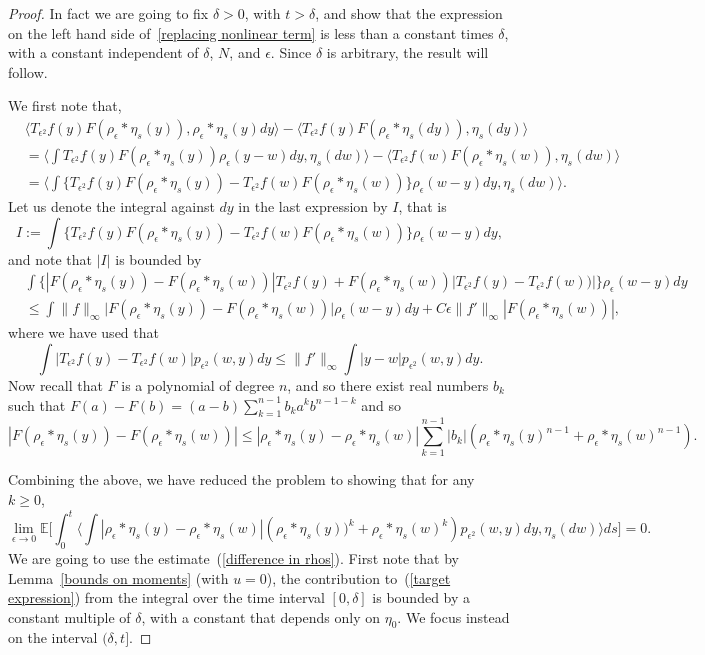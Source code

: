 \documentclass[EJP]{ejpecp} %
\newcommand{\IE}{\mathbb E}
\begin{document}
\begin{proof}
In fact we are going to fix $\delta>0$, with $t>\delta$, and show that
the expression on the left hand side of~\eqref{replacing nonlinear term} is
less than a constant times $\delta$, with a constant independent of $\delta$,
$N$, and $\epsilon$. Since $\delta$ is arbitrary, the result will follow.

We first note that,
\begin{align*}
    &
\langle T_{\epsilon^2} f(y) F(\rho_\epsilon * \eta_s(y)), 
\rho_\epsilon * \eta_s(y) dy \rangle 
-\langle T_{\epsilon^2} f(y) F(\rho_\epsilon *\eta_s(dy)), \eta_s(dy) \rangle 
\\ 
& = 
\langle \int T_{\epsilon^2} f(y) 
F(\rho_\epsilon * \eta_s(y))\rho_\epsilon(y-w) dy, \eta_s(dw)\rangle - \langle 
T_{\epsilon^2} f(w) F(\rho_\epsilon*\eta_s(w)), \eta_s(dw) \rangle 
\\ 
&= 
\langle \int \big\{ T_{\epsilon^2} f(y) F(\rho_\epsilon*\eta_s(y))-T_{\epsilon^2}f(w) 
F(\rho_\epsilon*\eta_s(w))\big\} 
\rho_\epsilon(w-y)dy, \eta_s(dw) \rangle.
\end{align*}
Let us denote the integral against $dy$ in the last expression by $I$, that is 
\[ I :=  \int \{ T_{\epsilon^2} f(y) 
F(\rho_\epsilon*\eta_s(y))-T_{\epsilon^2}f(w) 
F(\rho_\epsilon*\eta_s(w))\} \rho_\epsilon(w-y)dy, \]
and note that $|I|$ is bounded by
\begin{align}
& \int 
\Big\{ |F(\rho_\epsilon*\eta_s(y))-F(\rho_\epsilon*\eta_s(w))|T_{\epsilon^2}f(y)+
F(\rho_\epsilon*\eta_s(w))|T_{\epsilon^2}f(y)-T_{\epsilon^2}f(w))|\Big\} 
\rho_{\epsilon}(w-y)dy
\nonumber \\ &\leq \int \| f\|_{\infty} 
\big|F(\rho_\epsilon*\eta_s(y))-F(\rho_\epsilon*\eta_s(w))\big| \rho_\epsilon(w-y)dy + 
C \epsilon\|f' \|_\infty |F(\rho_\epsilon*\eta_s(w))|, \label{FirstBoundCT}
\end{align}
where we have used that 
\[
\int |T_{\epsilon^2}f(y)-T_{\epsilon^2}f(w)| p_{\epsilon^2}(w,y)dy
\leq \|f'\|_\infty\int|y-w|p_{\epsilon^2}(w,y)dy.
\]
Now recall that $F$ is a polynomial of degree $n$, and so 
there exist real numbers $b_k$ such
that $F(a)-F(b)= (a-b)\sum_{k=1}^{n-1} b_k a^k b^{n-1-k}$ and so 
\[
|F(\rho_\epsilon*\eta_s(y))-F(\rho_\epsilon*\eta_s(w))|
\leq 
|\rho_\epsilon*\eta_s(y)-\rho_\epsilon*\eta_s(w)|
\sum_{k=1}^{n-1}|b_k|\left(\rho_\epsilon*\eta_s(y)^{n-1}+\rho_\epsilon*\eta_s(w)^{n-1}\right).
\]

Combining the above, we have reduced the problem to showing that for any $k \ge 0$,
\begin{equation}
\label{target expression}
	\lim_{\epsilon\to 0}
	\IE\Big[	\int_0^t\big\langle \int |\rho_\epsilon*\eta_s(y)-\rho_\epsilon*\eta_s(w)|
\left(\rho_\epsilon*\eta_s(y))^k+\rho_\epsilon*\eta_s(w)^k\right)
	p_{\epsilon^2}(w,y)dy, \eta_s(dw)\big\rangle ds\Big]
=0 .
\end{equation}
We are going to use the estimate~(\ref{difference in rhos}).
First note that by Lemma~\ref{bounds on moments} (with $u=0$),
the contribution to~(\ref{target expression}) from the integral over
the time interval $[0,\delta]$ is bounded by a constant multiple of $\delta$, 
with a constant that depends only on $\eta_0$.
We focus instead
on the interval $(\delta, t]$.


\end{proof}
\end{document}
